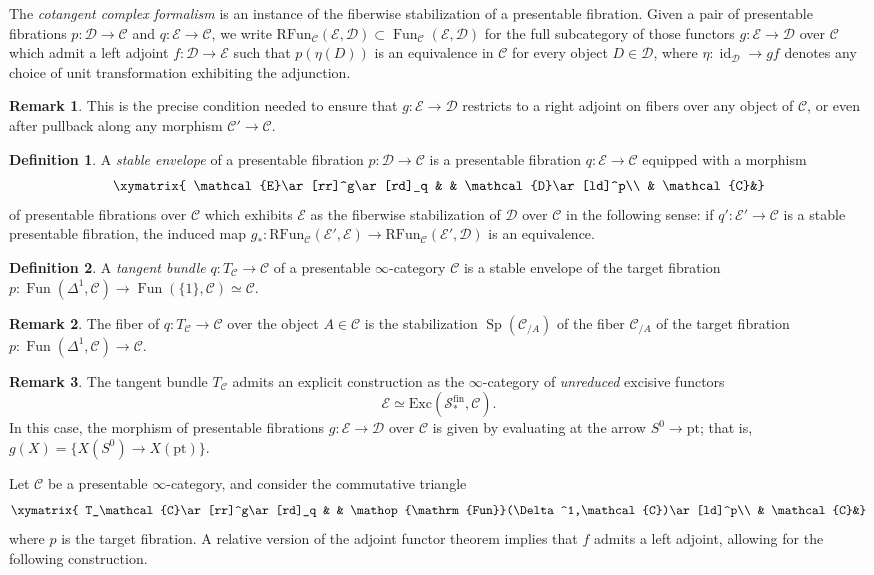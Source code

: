 \documentclass{article}
\theoremstyle{definition}
\newtheorem{definition}{Definition}[subsection]
\newtheorem{remark}{Remark}[subsection]
\newcommand{\C}{\mathcal{C}}
\newcommand{\D}{\mathcal{D}}
\newcommand{\E}{\mathcal{E}}
\renewcommand{\S}{\mathcal{S}}
\renewcommand{\i}{\infty}
\DeclareMathOperator{\Fun}{Fun}
\newcommand{\Funr}{\mathrm{RFun}}
\DeclareMathOperator{\id}{id}
\DeclareMathOperator{\Sp}{Sp}
\newcommand{\pt}{\mathrm{pt}}
\begin{document}
The {\em cotangent complex formalism} is an instance of the fiberwise stabilization of a presentable  fibration.
Given a pair of presentable fibrations $p:\D\to\C$ and $q:\E\to\C$, we write $\Funr_\C(\E,\D)\subset\Fun_\C(\E,\D)$ for the full subcategory of those functors $g:\E\to\D$ over $\C$ which admit a left adjoint $f:\D\to\E$ such that $p(\eta(D))$ is an equivalence in $\C$ for every object $D\in\D$, where $\eta:\id_\D\to gf$ denotes any choice of unit transformation exhibiting the adjunction.
\begin{remark}
This is the precise condition needed to ensure that $g:\E\to\D$ restricts to a right adjoint on fibers over any object of $\C$, or even after pullback along any morphism $\C'\to\C$. 
\end{remark}
\begin{definition}
A {\em stable envelope} of a presentable fibration $p:\D\to\C$ is a presentable fibration $q:\E\to\C$ equipped with a morphism 
\[
\xymatrix{
\E\ar[rr]^g\ar[rd]_q & & \D\ar[ld]^p\\
& \C &}
\]
of presentable fibrations over $\C$ which exhibits $\E$ as the fiberwise stabilization of $\D$ over $\C$ in the following sense: if $q':\E'\to\C$ is a stable presentable fibration, the induced map $g_*:\Funr_\C(\E',\E)\to\Funr_\C(\E',\D)$ is an equivalence.
\end{definition}


\begin{definition}
A {\em tangent bundle} $q:T_\C\to\C$ of a presentable $\infty$-category $\C$ is a stable envelope of the target fibration $p:\Fun(\Delta^1,\C)\to\Fun(\{1\},\C)\simeq\C$.
\end{definition}

\begin{remark}The fiber of $q:T_\C\to\C$ over the object $A\in\C$ is the stabilization $\Sp(\C_{/A})$ of the fiber $\C_{/A}$ of the target fibration $p:\Fun(\Delta^1,\C)\to\C$.
\end{remark}
\begin{remark}
The tangent bundle $T_\C$ admits an explicit construction as the $\i$-category of {\em unreduced} excisive functors
\[
\E\simeq\mathrm{Exc}(\S_*^\mathrm{fin},\C).
\]
In this case, the morphism of presentable fibrations $g:\E\to\D$ over $\C$ is given by evaluating  at the arrow $S^0\to\pt$; that is, $g(X)=\{X(S^0)\to X(\pt)\}$.
\end{remark}


Let $\C$ be a presentable $\i$-category, and consider the commutative triangle
\[
\xymatrix{
T_\C\ar[rr]^g\ar[rd]_q & & \Fun(\Delta^1,\C)\ar[ld]^p\\
& \C &}
\]
where $p$ is the target fibration.
A relative version of the adjoint functor theorem implies that $f$ admits a left adjoint,
allowing for the following construction.
\end{document}
